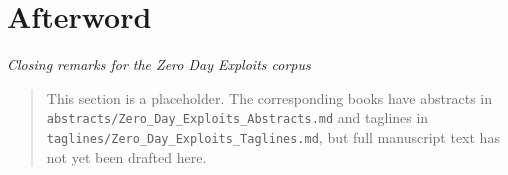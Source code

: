 
\section*{Afterword}

\textit{Closing remarks for the Zero Day Exploits corpus}

\begin{quotation}
\noindent This section is a placeholder. The corresponding books have abstracts
in \texttt{abstracts/Zero\_Day\_Exploits\_Abstracts.md} and taglines in
\texttt{taglines/Zero\_Day\_Exploits\_Taglines.md}, but full manuscript text
has not yet been drafted here.
\end{quotation}
